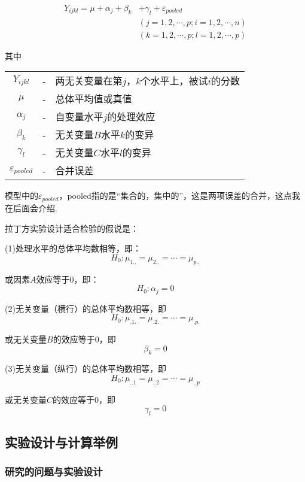 \begin{definition}[单因素拉丁方设计模型]
\begin{align*}
    Y_{ijkl} = \mu + \alpha _j + \beta _k & + \gamma _l + \varepsilon _{pooled}\\
                                          &(j=1,2,\cdots,p;i=1,2,\cdots,n)\\
                                          &(k=1,2,\cdots,p;l=1,2,\cdots,p)
\end{align*}

其中

\begin{tabular}{ccl}
    $Y_{ijkl}$     & - &    两无关变量在第$j，k$个水平上，被试$i$的分数\\ 
    $\mu$          & - &    总体平均值或真值\\
    $\alpha _j$    & - &    自变量水平$j$的处理效应\\
    $\beta _k$     & - &    无关变量$B$水平$k$的变异\\
    $\gamma _l$    & - &    无关变量$C$水平$l$的变异\\
    $\varepsilon _{pooled}$ &-& 合并误差
\end{tabular}

\end{definition}

模型中的$\varepsilon _{pooled}$，pooled指的是“集合的，集中的”，这是两项误差的合并，这点我在后面会介绍.

拉丁方实验设计适合检验的假说是：

(1)处理水平的总体平均数相等，即：
\[ H_0 : \mu _{1..} = \mu _{2..} = \cdots = \mu _{p..}\]

或因素$A$效应等于0，即：
\[ H_0 : \alpha _j = 0 \]

(2)无关变量（横行）的总体平均数相等，即
\[ H_0 : \mu _{.1.} = \mu _{.2.} = \cdots = \mu _{.p.} \]

或无关变量$B$的效应等于0，即
\[ \beta _k = 0 \]

(3)无关变量（纵行）的总体平均数相等，即
\[ H_0 : \mu _{..1} = \mu _{..2} = \cdots = \mu _{..p} \]

或无关变量$C$的效应等于0，即
\[ \gamma _l = 0 \]




 \subsection{实验设计与计算举例}
 
 \subsubsection{研究的问题与实验设计}
 
